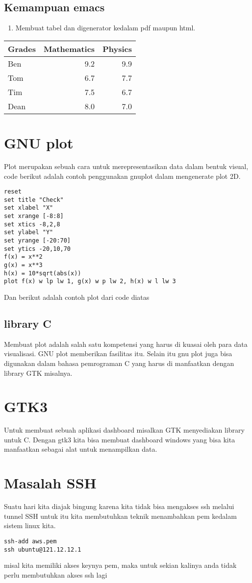 \documentclass[11pt]{article}
\begin{document}
\subsection{Kemampuan emacs}
\label{sec:org8bf28d9}
\begin{enumerate}
\item Membuat tabel dan digenerator kedalam pdf maupun html.
\end{enumerate}

\begin{center}
\begin{tabular}{lrr}
\hline
Grades & Mathematics & Physics\\
\hline
Ben & 9.2 & 9.9\\
Tom & 6.7 & 7.7\\
Tim & 7.5 & 6.7\\
Dean & 8.0 & 7.0\\
\end{tabular}
\end{center}

\section{GNU plot}
\label{sec:org0406881}
Plot merupakan sebuah cara untuk merepresentasikan data dalam bentuk visual,
code berikut adalah contoh penggunakan gnuplot dalam mengenerate plot 2D.
\begin{verbatim}
reset
set title "Check"
set xlabel "X"
set xrange [-8:8]
set xtics -8,2,8
set ylabel "Y"
set yrange [-20:70]
set ytics -20,10,70
f(x) = x**2
g(x) = x**3
h(x) = 10*sqrt(abs(x))
plot f(x) w lp lw 1, g(x) w p lw 2, h(x) w l lw 3
\end{verbatim}
Dan berikut adalah contoh plot dari code diatas
\subsection{library C}
\label{sec:orga88a1c9}
Membuat plot adalah salah satu kompetensi yang harus di kuasai oleh para
data visualisasi. GNU plot memberikan fasilitas itu. Selain itu gnu plot 
juga bisa digunakan dalam bahasa pemrograman C yang harus di manfaatkan 
dengan library GTK misalnya. 
\section{GTK3}
\label{sec:org06b42a2}
Untuk membuat sebuah aplikasi dashboard misalkan GTK menyediakan library untuk C.
Dengan gtk3 kita bisa membuat dashboard windows yang bisa kita manfaatkan sebagai
alat untuk menampilkan data.
\section{Masalah SSH}
\label{sec:orgc612a8c}
Suatu hari kita diajak bingung karena kita tidak bisa mengakses ssh melalui
tunnel SSH untuk itu kita membutuhkan teknik menambahkan pem kedalam 
sistem linux kita.
\begin{verbatim}
ssh-add aws.pem
ssh ubuntu@121.12.12.1
\end{verbatim}
misal kita memiliki akses keynya pem, maka untuk sekian kalinya anda tidak perlu
membutuhkan akses ssh lagi
\end{document}
